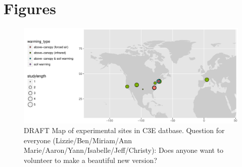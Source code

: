 \documentclass{article}
\begin{document}
\section* {Figures}
\begin{figure}[p]
\centering
\includegraphics{../Analyses/maps/expsites.pdf} 
\caption{DRAFT Map of experimental sites in C3E datbase. Question for everyone (Lizzie/Ben/Miriam/Ann Marie/Aaron/Yann/Isabelle/Jeff/Christy): Does anyone want to volunteer to make a beautiful new version?} 
 \label{fig:map}
 \end{figure}
\end{document}
